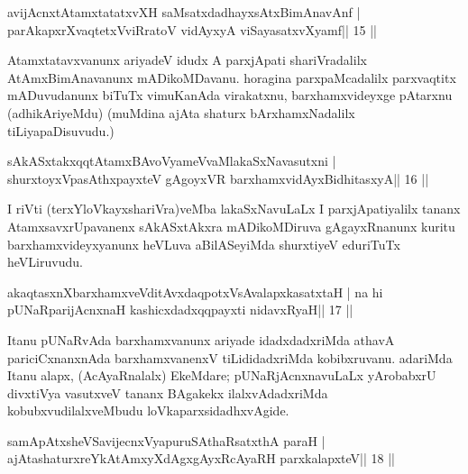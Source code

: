  

\begin{shl}
avijAcnxtAtamxtatatxvXH saMsatxdadhayxsAtxBimAnavAnf |
parAkapxrXvaqtetxVviRratoV vidAyxyA viSayasatxvXyamf\hfill || 15 ||
\end{shl}

\begin{artha}
Atamxtatavxvanunx ariyadeV idudx A parxjApati shariVradalilx 
AtAmxBimAnavanunx mADikoMDavanu. horagina parxpaMcadalilx parxvaqtitx 
mADuvudanunx biTuTx vimuKa\-nAda virakatxnu, barxhamxvideyxge pAtarxnu 
(adhikAriyeMdu) (muMdina ajAta shaturx bArxhamxNadalilx 
tiLiyapaDisuvudu.)
\end{artha}

\begin{shl}
sAkASxtakxqqtAtamxBAvoV\s yameVvaMlakaSxNavasutxni |
shurxtoyxVpasAthxpayxteV gAgoyxVR barxhamxvidAyxBidhitasxyA\hfill || 16 ||
\end{shl}

\begin{artha}
I riVti (terxYloVkayxshariVra)veMba lakaSxNavuLaLx I parxjApatiyalilx 
tananx AtamxsavxrUpavanenx sAkASxtAkxra mADikoMDiruva gAgayxRnanunx kuritu barxhamxvideyxyanunx heVLuva aBilASeyiMda shurxtiyeV eduriTuTx heVLiruvudu.
\end{artha} 
 

\begin{shl}
akaqtasxnXbarxhamxveVditAvxdaqpotxV\s sAvalapxkasatxtaH |
na hi pUNaRparijAcnxnaH kashicxdadxqqpayxti nidavxRyaH\hfill || 17 ||
\end{shl}

\begin{artha}
Itanu pUNaRvAda barxhamxvanunx ariyade idadxdadxriMda athavA pariciCxnanxnAda barxhamxvanenxV tiLididadxriMda kobibxruvanu. adariMda Itanu alapx, (AcAyaRnalalx) EkeMdare; pUNaRjAcnxnavuLaLx yArobabxrU divxtiVya vasutxveV tananx BAgakekx ilalxvAdadxriMda kobubxvudilalxveMbudu loVkaparxsidadhxvAgide.
\end{artha}

\begin{shl}
samApAtxsheVSavijecnxVyapuruSAthaRsatxthA paraH |
ajAtashaturxreYkAtAmxyXdAgxgAyxRcAyaRH parxkalapxteV\hfill || 18 ||
\end{shl}

